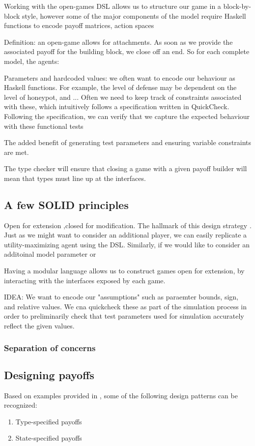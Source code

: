 Working with the open-games DSL allows us to structure our game in a block-by-block style, however some of the major components of the model require Haskell functions to encode payoff matrices, action spaces

Definition: an open-game allows for attachments. As soon as we provide the associated payoff for the building block, we close off an end. So for each complete model, the agents: 


Parameters and hardcoded values: we often want to encode our behaviour as Haskell functions. For example, the level of defense may be dependent on the level of honeypot, and ... Often we need to keep track of constraints associated with these, which intuitively follows a specification written in QuickCheck. Following the specification, we can verify that we capture the expected behaviour with these functional tests 

The added benefit of generating test parameters and ensuring variable constraints are met.

The type checker will ensure that closing a game with a given payoff builder will mean that types must line up at the interfaces. 

\subsection{A few SOLID principles}
Open for extension ,closed for modification. The hallmark of this design strategy . Just as we might want to consider an additional player, we can easily replicate a utility-maximizing agent using the DSL. Similarly, if we would like to consider an additoinal model parameter or 

Having a modular language allows us to construct games open for extension, by interacting with the interfaces exposed by each game. 

IDEA: We want to encode our "assumptions" such as paraemter bounds, sign, and relative values. We cna quickcheck these as part of the simulation process in order to preliminarily check that test parameters used for simulation accurately reflect the given values. 
\subsubsection{Separation of concerns}

\subsection{Designing payoffs}
Based on examples provided in \cite{Zahn2024}, some of the following design patterns can be recognized:
\begin{enumerate}
	\item Type-specified payoffs 
	\item State-specified payoffs
\end{enumerate}
